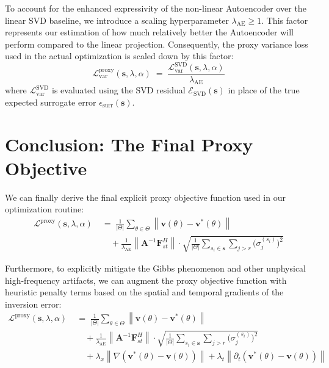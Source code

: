 \documentclass[11pt, a4paper]{article}
\newcommand{\norm}[1]{\left\|#1\right\|}
\begin{document}
To account for the enhanced expressivity of the non-linear Autoencoder over the linear SVD baseline, we introduce a scaling hyperparameter $\lambda_{\mathrm{AE}} \geq 1$. This factor represents our estimation of how much relatively better the Autoencoder will perform compared to the linear projection. Consequently, the proxy variance loss used in the actual optimization is scaled down by this factor:
\begin{equation}
    \mathcal{L}_{\mathrm{var}}^{\mathrm{proxy}}(\mathbf{s}, \lambda, \alpha) \;=\; \frac{\mathcal{L}_{\mathrm{var}}^{\mathrm{SVD}}(\mathbf{s}, \lambda, \alpha)}{\lambda_{\mathrm{AE}}}
\end{equation}
where $\mathcal{L}_{\mathrm{var}}^{\mathrm{SVD}}$ is evaluated using the SVD residual $\mathcal{E}_{\mathrm{SVD}}(\mathbf{s})$ in place of the true expected surrogate error $\epsilon_{\mathrm{surr}}(\mathbf{s})$.

\section{Conclusion: The Final Proxy Objective}

We can finally derive the final explicit proxy objective function used in our optimization routine:
\begin{equation}
    \boxed{ \begin{aligned}
        \mathcal{L}^{\mathrm{proxy}}(\mathbf{s}, \lambda, \alpha) \;&=\; \frac{1}{|\Theta|} \sum_{\theta \in \Theta} \norm{\mathbf{v}(\theta) - \mathbf{v}^*(\theta)} \\
        &\quad + \frac{1}{\lambda_{\mathrm{AE}}} \norm{\mathbf{A}^{-1}\mathbf{F}_{st}^H} \cdot \sqrt{ \frac{1}{|\Theta|} \sum_{s_i \in \mathbf{s}} \sum_{j > r} \bigl(\sigma_j^{(s_i)}\bigr)^2 } 
    \end{aligned} }
\end{equation}

Furthermore, to explicitly mitigate the Gibbs phenomenon and other unphysical high-frequency artifacts, we can augment the proxy objective function with heuristic penalty terms based on the spatial and temporal gradients of the inversion error:
\begin{equation}
    \begin{aligned}
        \mathcal{L}^{\mathrm{proxy}}(\mathbf{s}, \lambda, \alpha) \;&=\; \frac{1}{|\Theta|} \sum_{\theta \in \Theta} \norm{\mathbf{v}(\theta) - \mathbf{v}^*(\theta)} \\
        &\quad + \frac{1}{\lambda_{\mathrm{AE}}} \norm{\mathbf{A}^{-1}\mathbf{F}_{st}^H} \cdot \sqrt{ \frac{1}{|\Theta|} \sum_{s_i \in \mathbf{s}} \sum_{j > r} \bigl(\sigma_j^{(s_i)}\bigr)^2 } \\
        &\quad + \lambda_x \norm{\nabla \left(\mathbf{v}^*(\theta) -\mathbf{v}(\theta)\right)} + \lambda_t \norm{\partial_t \left(\mathbf{v}^*(\theta) -\mathbf{v}(\theta)\right)}
    \end{aligned}
\end{equation}
\end{document}
